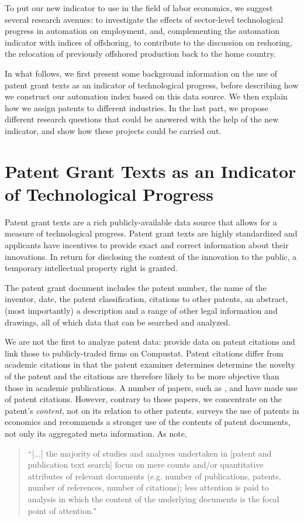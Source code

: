 \documentclass[11pt,a4paper]{article}
\begin{document}
To put our new indicator to use in the field of labor economics, we suggest several research avenues: to investigate the effects of sector-level technological progress in automation on employment, and, complementing the automation indicator with indices of offshoring, to contribute to the discussion on reshoring, the relocation of previously offshored production back to the home country.

In what follows, we first present some background information on the use of patent grant texts as an indicator of technological progress, before describing how we construct our automation index based on this data source. We then explain how we assign patents to different industries. In the last part, we propose different research questions that could be answered with the help of the new indicator, and show how these projects could be carried out.


\section{Patent Grant Texts as an Indicator of Technological Progress}
Patent grant texts are a rich publicly-available data source that allows for a measure of technological progress. Patent grant texts are highly standardized and applicants have incentives to provide exact and correct information about their innovations. In return for disclosing the content of the innovation to the public, a temporary intellectual property right is granted. 

The patent grant document includes the patent number, the name of the inventor, date, the patent classification, citations to other patents, an abstract, (most importantly) a description and a range of other legal information and drawings, all of which data that can be searched and analyzed. 

We are not the first to analyze patent data: \cite{HJT2001} provide data on patent citations and link those to publicly-traded firms on Compustat. Patent citations differ from academic citations in that the patent examiner determines determine the novelty of the patent and the citations are therefore likely to be more objective than those in academic publications. A number of papers, such as \cite{AAC2014} , \cite{ABP2015} and \cite{BCJPV2015} have made use of patent citations. However, contrary to those papers, we concentrate on the patent's \textit{content}, not on its relation to other patents.  \cite{G1998} surveys the use of patents in economics and recommends a stronger use of the contents of patent documents, not only its aggregated meta information.
As \citep[p.~290]{MVS2010} note, 
\begin{quotation} 
``[...] the majority of studies and analyses undertaken in [patent and publication text search] focus on mere counts and/or quantitative attributes of relevant documents (e.g. number of publications, patents, number of references, number of citations); less attention is paid to analysis in which the content of the underlying documents is the focal point of attention."
\end{quotation}
\end{document}
